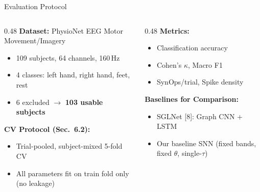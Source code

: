 \documentclass[10pt]{beamer}
\begin{document}
\begin{frame}{Evaluation Protocol}

\begin{columns}[T]
\begin{column}{0.48\textwidth}
\footnotesize
\textbf{Dataset:} PhysioNet EEG Motor Movement/Imagery
\begin{itemize}
  \item 109 subjects, 64 channels, 160\,Hz
  \item 4 classes: left hand, right hand, feet, rest
  \item 6 excluded $\to$ \textbf{103 usable subjects}
\end{itemize}

\vspace{2pt}
\textbf{CV Protocol (Sec.~6.2):}
\begin{itemize}
  \item Trial-pooled, subject-mixed 5-fold CV
  \item All parameters fit on train fold only (no leakage)
\end{itemize}
\end{column}
\begin{column}{0.48\textwidth}
\footnotesize
\textbf{Metrics:}
\begin{itemize}
  \item Classification accuracy
  \item Cohen's $\kappa$, Macro F1
  \item SynOps/trial, Spike density
\end{itemize}

\vspace{2pt}
\textbf{Baselines for Comparison:}
\begin{itemize}
  \item SGLNet [8]: Graph CNN + LSTM
  \item Our baseline SNN (fixed bands, fixed $\theta$, single-$\tau$)
\end{itemize}
\end{column}
\end{columns}

\end{frame}
\end{document}
